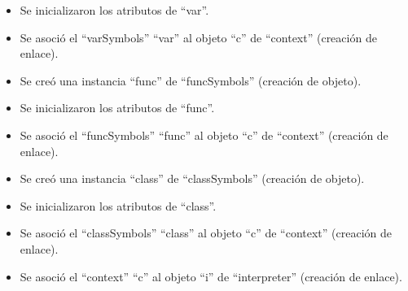 \begin{framed}
\begin{description}
\begin {itemize}
         \item Se inicializaron los atributos de ``var''.
         \item Se asoció el ``varSymbols'' ``var'' al objeto ``c'' de ``context'' (creación de enlace).
         \item Se creó una instancia ``func'' de ``funcSymbols'' (creación de objeto).
         \item Se inicializaron los atributos de ``func''.
         \item Se asoció el ``funcSymbols'' ``func'' al objeto ``c'' de ``context'' (creación de enlace).
         \item Se creó una instancia ``class'' de ``classSymbols'' (creación de objeto).
         \item Se inicializaron los atributos de ``class''.
         \item Se asoció el ``classSymbols'' ``class'' al objeto ``c'' de ``context'' (creación de enlace).
         \item Se asoció el ``context'' ``c'' al objeto ``i'' de ``interpreter'' (creación de enlace).
      

\end{itemize}
\end{description}
\end{framed}
